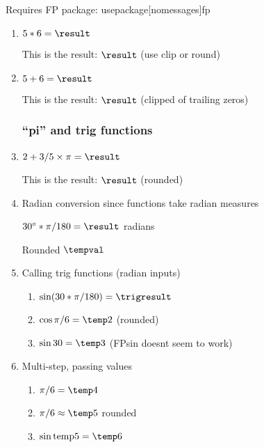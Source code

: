 



Requires FP package: usepackage[nomessages]{fp}

\begin{enumerate}[itemsep=0.25cm]
\item {}
$5*6=\result$
\par This is the result: $\result$ (use clip or round)

\item {}
$5+6=\result$
\par This is the result: $\result$ (clipped of trailing zeros)

\subsubsection*{``pi'' and trig functions}
\item {}
$2+3/5\times\pi=\result$
\par This is the result: $\result$ (rounded)

\item Radian conversion since functions take radian measures \par 
{}
$30^\circ*\pi/180=\result$ radians \par
 Rounded  $\tempval$

 \item Calling trig functions (radian inputs)
 \begin{enumerate}
    \item {}
        $\sin (30*\pi / 180) = \trigresult$
    \item {} 
        $\cos \pi/6 = \temp2$ (rounded)
    \item {} 
        $\sin 30 = \temp3$ (FPsin doesnt seem to work)
 \end{enumerate}

\item Multi-step, passing values
\begin{enumerate}
    \item {} 
        $\pi/6 = \temp4$
    \item {} 
        $\pi/6 \approx \temp5$ rounded
    \item {} 
        $\sin \text{temp5} = \temp6$
\end{enumerate}


\end{enumerate}
